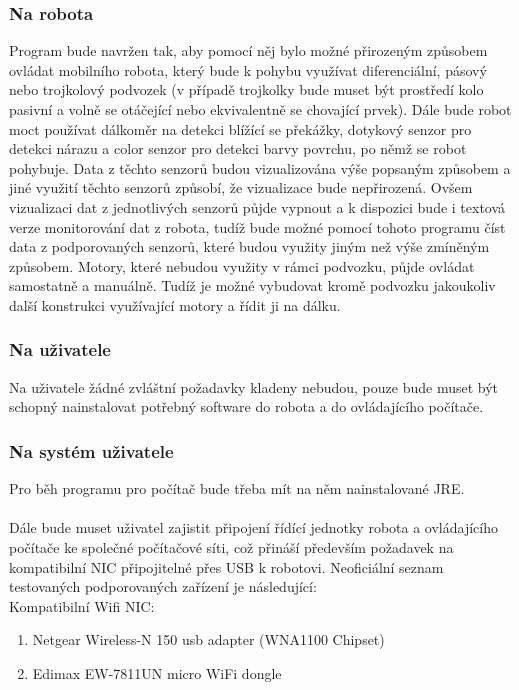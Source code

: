 \documentclass[12pt, ngerman]{article}
\begin{document}
\subsubsection{Na robota}
Program bude navržen tak, aby pomocí něj bylo možné přirozeným způsobem ovládat  mobilního robota, který bude k pohybu využívat diferenciální, pásový nebo trojkolový podvozek (v případě trojkolky bude muset být prostředí kolo pasivní a volně se otáčející nebo ekvivalentně se chovající prvek). Dále bude robot moct používat dálkoměr na detekci blížící se překážky, dotykový senzor pro detekci nárazu a color senzor pro detekci barvy povrchu, po němž se robot pohybuje. Data z těchto senzorů budou vizualizována výše popsaným způsobem a jiné využití těchto senzorů způsobí, že vizualizace bude nepřirozená. Ovšem vizualizaci dat z  jednotlivých senzorů půjde vypnout a k dispozici bude i textová verze monitorování dat z robota, tudíž bude možné pomocí tohoto programu číst data z podporovaných senzorů, které budou využity jiným než výše zmíněným způsobem. Motory, které nebudou využity v rámci podvozku, půjde ovládat samostatně a manuálně. Tudíž je možné vybudovat kromě podvozku jakoukoliv další konstrukci využívající motory a řídit ji na dálku.

\subsubsection{Na uživatele}
Na uživatele žádné zvláštní požadavky kladeny nebudou, pouze bude muset být schopný nainstalovat potřebný software do robota a do ovládajícího počítače.

\subsubsection{Na systém uživatele}
Pro běh programu pro počítač bude třeba mít na něm nainstalované JRE.\\\\
Dále bude muset uživatel zajistit připojení řídící jednotky robota a ovládajícího počítače ke společné počítačové síti, což přináší především požadavek na kompatibilní NIC připojitelné přes USB k robotovi. Neoficiální seznam testovaných podporovaných zařízení je následující:\\

Kompatibilní Wifi NIC:
\begin{enumerate}[leftmargin=5mm]
\item Netgear Wireless-N 150 usb adapter (WNA1100 Chipset)
\item Edimax EW-7811UN micro WiFi dongle
\end{enumerate} 
\end{document}
